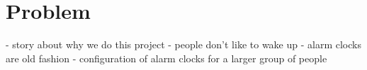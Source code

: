 \chapter{Problem}
- story about why we do this project
	- people don't like to wake up
	- alarm clocks are old fashion
	- configuration of alarm clocks for a larger group of people